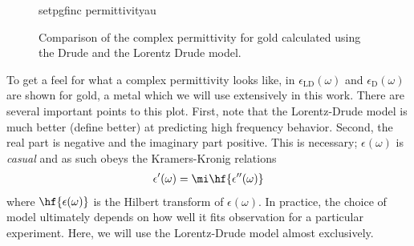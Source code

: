 \begin{figure}[ht]
\centering
{setpgfinc}
{permittivityau}
\caption{Comparison of the complex permittivity for gold calculated using the Drude
and the Lorentz Drude model.}
\label{fig:permittivityau}
\end{figure}

To get a feel for what a complex permittivity looks like, in
 $\epsilon_\mathrm{LD}(\omega)$ and
$\epsilon_\mathrm{D}(\omega)$ are shown for gold, a metal which we will use
extensively in this work.  There are several important points to this plot.
First, note that the Lorentz-Drude model is much better (define
better) at predicting high
frequency behavior.  Second, the real part is negative and the
imaginary part positive.  This is necessary; $\epsilon(\omega)$ is
\textit{casual} and as such obeys the Kramers-Kronig relations
\begin{align}
\epsilon^\prime(\omega)=\mi \hf{\epsilon^{\prime\prime}(\omega)}
\end{align}
where $\hf{\epsilon(\omega)}$ is the Hilbert transform of
$\epsilon(\omega)$.  In practice, 
the choice of model ultimately depends on how well it fits observation for
a particular experiment.  Here, we will use the Lorentz-Drude model almost
exclusively.
